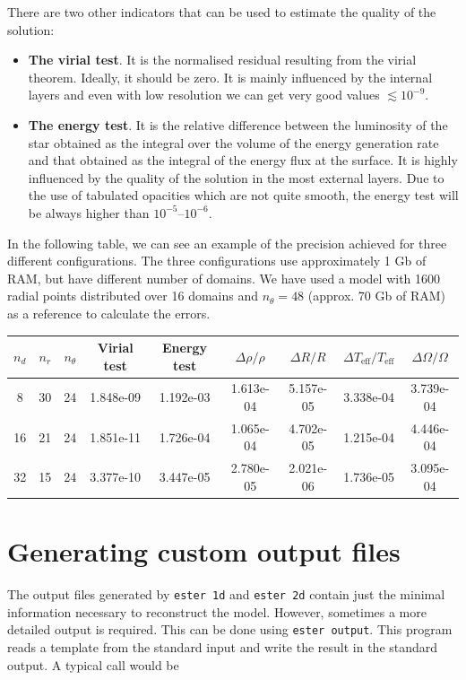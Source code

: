 \pagebreak

There are two other indicators that can be used to estimate the quality of the solution:
\begin{itemize}
\item {\bf The virial test}. It is the normalised residual resulting from the virial theorem.
Ideally, it should be zero. It is mainly influenced by the internal layers and even with
low resolution we can get very good values $\lesssim10^{-9}$.
\item {\bf The energy test}. It is the relative difference between the luminosity of the star
obtained as the integral over the volume of the energy generation rate and that obtained
as the integral of the energy flux at the surface. It is highly influenced by the quality
of the solution in the most external layers. Due to the use of tabulated opacities which are not
quite smooth, the energy test will be always higher than $10^{-5}$--$10^{-6}$. 
\end{itemize}

In the following table, we can see an example of the precision achieved for three different
configurations. The three configurations use approximately 1 Gb of RAM, but have different
number of domains. We have used a model with 1600 radial points distributed over 16 domains
and $n_\theta=48$ (approx. 70 Gb of RAM) as a reference to calculate the errors.

\begin{center}
\begin{tabular}{c|c|c||c|c|c|c|c|c}
$n_d$ & $n_r$ & $n_\theta$ & Virial test & Energy test &
$\Delta\rho/\rho$ & $\Delta R/R$ & $\Delta T_\mathrm{eff}/T_\mathrm{eff}$ & $\Delta \Omega/\Omega$ \\
\hline
8 & 30 & 24 & 1.848e-09 & 1.192e-03 & 
1.613e-04 & 5.157e-05 & 3.338e-04 & 3.739e-04 \\
16 & 21 & 24 & 1.851e-11 & 1.726e-04 &
1.065e-04 & 4.702e-05 & 1.215e-04 & 4.446e-04 \\
32 & 15 & 24 & 3.377e-10 & 3.447e-05 &
2.780e-05 & 2.021e-06 & 1.736e-05 & 3.095e-04 \\
\end{tabular}
\end{center}

\section{Generating custom output files}

The output files generated by {\tt ester 1d} and {\tt ester 2d} contain just
the minimal information necessary to reconstruct the model. However,
sometimes a more detailed output is required.  This can be done using
 {\tt ester output}. This program
reads a template from the standard input and write the result in the
standard output.  A typical call would be

